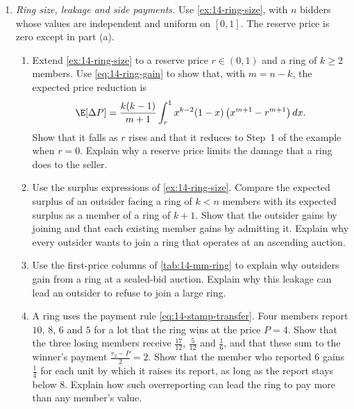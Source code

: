 \begin{enumerate}[label=\arabic*., leftmargin=*, itemsep=6pt]
\item \textit{Ring size, leakage and side payments.} Use \cref{ex:14-ring-size}, with $n$ bidders whose values are independent
and uniform on $[0,1]$. The reserve price is zero except in part (a).
\begin{enumerate}[label=(\alph*)]
  \item Extend \cref{ex:14-ring-size} to a reserve price $r\in(0,1)$ and a ring of $k\ge 2$ members. Use
  \eqref{eq:14-ring-gain} to show that, with $m=n-k$, the expected price reduction is
  \[
  \E[\Delta P]=\frac{k(k-1)}{m+1}\int_r^1x^{k-2}(1-x)\left(x^{m+1}-r^{m+1}\right)dx.
  \]
  Show that it falls as $r$ rises and that it reduces to Step~1 of the example when $r=0$. Explain why a
  reserve price limits the damage that a ring does to the seller.
  \item Use the surplus expressions of \cref{ex:14-ring-size}. Compare the expected surplus of an outsider
  facing a ring of $k<n$ members with its expected surplus as a member of a ring of $k+1$. Show
  that the outsider gains by joining and that each existing member gains by admitting it. Explain why every
  outsider wants to join a ring that operates at an ascending auction.
  \item Use the first-price columns of \cref{tab:14-mm-ring} to explain why outsiders gain from a ring at a
  sealed-bid auction. Explain why this leakage can lead an outsider to refuse to join a large ring.
  \item A ring uses the payment rule \eqref{eq:14-stamp-transfer}. Four members report $10$, $8$, $6$ and
  $5$ for a lot that the ring wins at the price $P=4$. Show that the three losing members receive
  $\frac{17}{12}$, $\frac{5}{12}$ and $\frac{1}{6}$, and that these sum to the winner's payment $\frac{r_2-P}{2}=2$.
  Show that the member who reported $6$ gains $\frac{1}{4}$ for each unit by which it raises its report,
  as long as the report stays below $8$. Explain how such overreporting can lead the ring to pay more than any member's value.
\end{enumerate}

\end{enumerate}
